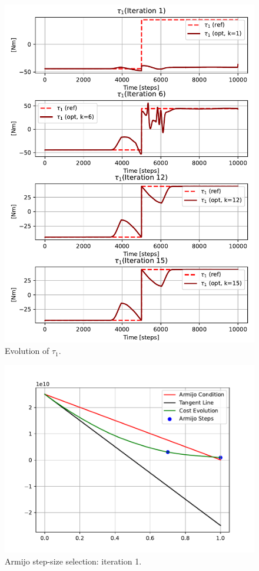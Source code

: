 \begin{figure}[htb]
    \centering
    \includegraphics[width=1\linewidth]{img/1-Task1/tau_evolution.pdf}
    \caption{Evolution of $\tau_1$.}
    \label{fig:tau1-evolution}
\end{figure}

\begin{figure}[htb]
    \centering
    \includegraphics[width=1\linewidth]{img/1-Task1/Armijo_iter_1.pdf}
    \caption{Armijo step-size selection: iteration 1.}
    \label{fig:armijo1}
\end{figure}

